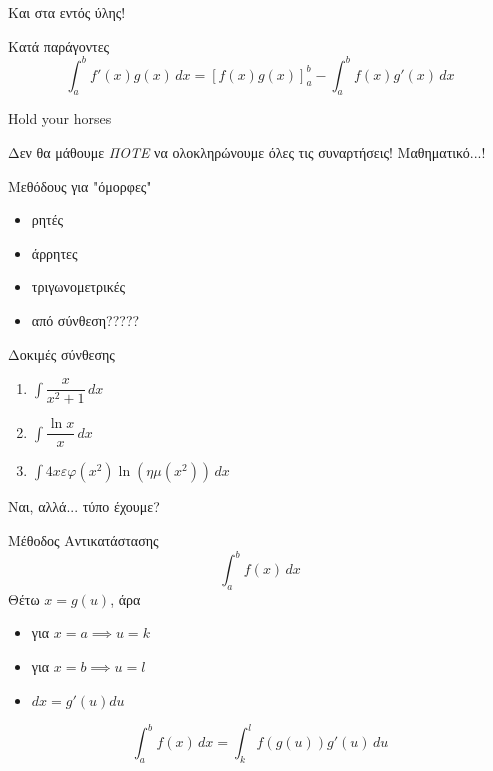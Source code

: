 \documentclass{presentation}
\begin{document}
\begin{frame}{Και στα εντός ύλης!}
    \begin{block}{Κατά παράγοντες}
        $$\int_a^b f'(x)g(x)\,dx=\left[ f(x)g(x) \right]_a^b -\int_a^b f(x)g'(x)\,dx$$
    \end{block}
\end{frame}

\begin{frame}{Hold your horses}

    Δεν θα μάθουμε \emph{ΠΟΤΕ} να ολοκληρώνουμε όλες τις συναρτήσεις! Μαθηματικό...!

    Μεθόδους για "όμορφες"

    \begin{itemize}
        \item<2-> ρητές
        \item<3-> άρρητες
        \item<4-> τριγωνομετρικές
        \item<5-> από σύνθεση?????
    \end{itemize}

\end{frame}

\begin{frame}{Δοκιμές σύνθεσης}
    \begin{enumerate}
        \item<1-> $\int \dfrac{x}{x^2+1}\,dx$
        \item<2-> $\int \dfrac{\ln x}{x}\, dx$
        \item<3-> $\int 4xεφ(x^2)\ln (ημ(x^2))\, dx$
    \end{enumerate}

\end{frame}

\begin{frame}{Ναι, αλλά... τύπο έχουμε?}
    \begin{block}{Μέθοδος Αντικατάστασης}
        $$\int_a^b f(x)\, dx$$
        Θέτω $x=g(u)$, άρα
        \begin{itemize}
            \item για $x=a\implies u=k$
            \item για $x=b\implies u=l$
            \item $dx=g'(u)du$
        \end{itemize}
        $$\int_a^b f(x)\, dx=\int_{k}^{l} f(g(u))g'(u)\,du$$
    \end{block}

\end{frame}
\end{document}
